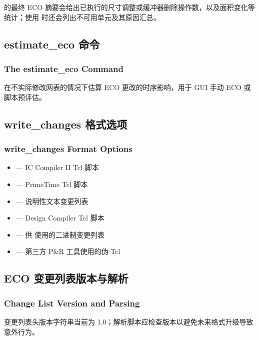  的最终 ECO 摘要会给出已执行的尺寸调整或缓冲器删除操作数，以及面积变化等统计；使用  时还会列出不可用单元及其原因汇总。

\subsection{estimate_eco 命令}
\subsubsection*{The estimate_eco Command}

 在不实际修改网表的情况下估算 ECO 更改的时序影响，用于 GUI 手动 ECO 或脚本预评估。

\subsection{write_changes 格式选项}
\subsubsection*{write_changes Format Options}

\begin{itemize}
  \item {} — IC Compiler II Tcl 脚本
  \item {} — PrimeTime Tcl 脚本
  \item {} — 说明性文本变更列表
  \item {} — Design Compiler Tcl 脚本
  \item {} — 供  使用的二进制变更列表
  \item {} — 第三方 P\&R 工具使用的伪 Tcl
\end{itemize}

\subsection{ECO 变更列表版本与解析}
\subsubsection*{Change List Version and Parsing}

\begin{noteBox}
变更列表头版本字符串当前为 1.0；解析脚本应检查版本以避免未来格式升级导致意外行为。
\end{noteBox}

